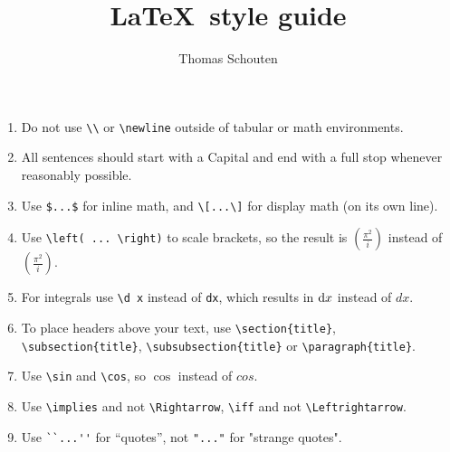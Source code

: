 \documentclass[11pt]{article}
\title{\LaTeX\ style guide}
\author{Thomas Schouten}
\begin{document}
    \maketitle
    \begin{enumerate}
        \item Do not use \verb|\\| or \verb|\newline| outside of tabular or math environments.

        \item All sentences should start with a Capital and end with a full stop whenever reasonably possible.

        \item Use \verb|$...$| for inline math, and \verb|\[...\]| for display math (on its own line).

        \item Use \verb|\left( ... \right)| to scale brackets, so the result is $\left( \frac{\pi^2}{i} \right)$ instead of $(\frac{\pi^2}{i})$.

        \item For integrals use \verb|\d x| instead of \verb|dx|, which results in $\mathop{}\!\mathrm{d} x$ instead of $dx$.

        \item To place headers above your text, use \verb|\section{title}|, \verb|\subsection{title}|, \verb|\subsubsection{title}| or \verb|\paragraph{title}|.

        \item Use \verb|\sin| and \verb|\cos|, so $\cos$ instead of $cos$.

        \item Use \verb|\implies| and not \verb|\Rightarrow|, \verb|\iff| and not \verb|\Leftrightarrow|.

        \item Use \verb|``...''| for ``quotes'', not \verb|"..."| for "strange quotes".


\end{enumerate}
\end{document}
